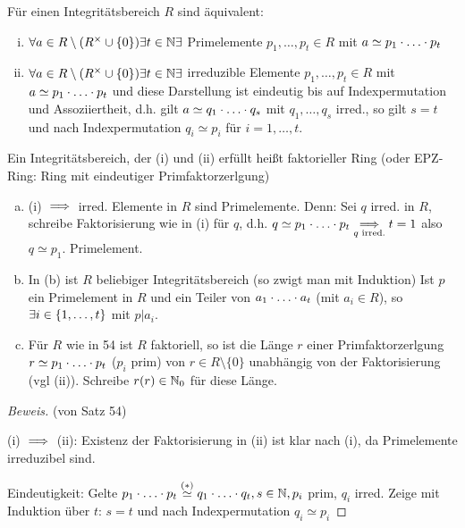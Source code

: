 \documentclass[a4paper]{report}
\begin{document}
\begin{satzdef}
  Für einen Integritätsbereich $R$ sind äquivalent:
  \begin{enumerate}[(i)]
    \item $\forall a \in R \setminus (R^\times \cup \{0\}) \exists t \in \mathbb{N} \exists$ Primelemente $p_{1}, \ldots, p_{t} \in R$ mit $a \simeq p_{1}\cdot  \ldots \cdot p_{t}$
    \item $\forall a \in R \setminus (R^\times \cup \{0\}) \exists t \in \mathbb{N} \exists$ irreduzible Elemente $p_{1}, \ldots, p_{t} \in R$ mit $a \simeq p_{1}\cdot  \ldots \cdot p_{t}$ und diese Darstellung ist eindeutig bis auf Indexpermutation und Assoziiertheit, d.h. gilt $a \simeq q_{1}\cdot \ldots \cdot q_{s}$ mit $q_{1}, \ldots, q_{s}$ irred., so gilt $s = t$ und nach Indexpermutation $q_{i} \simeq p_{i}$ für $i = 1, \ldots, t$.
  \end{enumerate}
  Ein Integritätsbereich, der (i) und (ii) erfüllt heißt faktorieller Ring (oder EPZ-Ring: Ring mit eindeutiger Primfaktorzerlgung)
  \begin{bem*}\item
\begin{enumerate}[(a)]
  \item (i) $\implies$ irred. Elemente in $R$ sind Primelemente. Denn: Sei $q$ irred. in $R$, schreibe Faktorisierung wie in (i) für $q$, d.h. $q \simeq p_{1}\cdot \ldots \cdot p_{t} \underset{q \text{ irred.}}{\implies} t = 1$ also $q \simeq p_{1}$. Primelement.
  \item In (b) ist $R$ beliebiger Integritätsbereich (so zwigt man mit Induktion) Ist $p$ ein Primelement in $R$ und ein Teiler von $a_{1}\cdot \ldots \cdot a_{t}$ (mit $a_{i} \in R$), so $\exists i \in \{1, \ldots, t\}$ mit $p | a_{i}$.
  \item Für $R$ wie in 54 ist $R$ faktoriell, so ist die Länge $r$ einer Primfaktorzerlgung $r \simeq p_{1} \cdot \ldots \cdot p_{t}$ ($p_{i}$ prim) von $r \in R \setminus \{0\}$ unabhängig von der Faktorisierung (vgl (ii)). Schreibe $r(r) \in \mathbb{N}_0$ für diese Länge.
\end{enumerate}
\end{bem*}
\begin{proof}[Beweis](von Satz 54)
  \item (i) $\implies$ (ii): Existenz der Faktorisierung in (ii) ist klar nach (i), da Primelemente irreduzibel sind.
  \item Eindeutigkeit: Gelte $p_{1} \cdot \ldots \cdot p_{t} \overset{(*)}\simeq q_{1} \cdot \ldots \cdot q_{t}, s \in \mathbb{N}, p_{i}$ prim, $q_{i}$ irred. Zeige mit Induktion über $t$: $s = t$ und nach Indexpermutation $q_{i} \simeq p_{i}$

\end{proof}
\end{satzdef}
\end{document}
